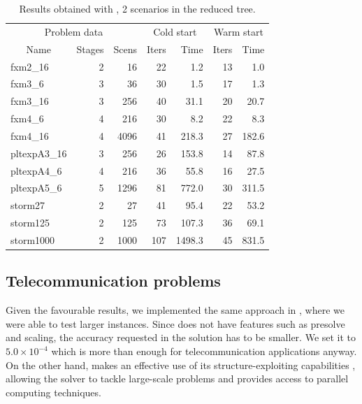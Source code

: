 \begin{table}[ht]
  \begin{center}
    \begin{tabular}{|l|r|r||r|r||r|r|} \hline
      \multicolumn{3}{|c||}{Problem data}&\multicolumn{2}{c||}{Cold start}&\multicolumn{2}{c|}{Warm start}\\
      \multicolumn{1}{|c|}{Name} & Stages & Scens & Iters & Time & Iters & Time \\ \hline \hline
fxm2\_16     &  2 &   16 &  22 &   1.2 & 13 &   1.0 \\
fxm3\_6      &  3 &   36 &  30 &   1.5 & 17 &   1.3 \\
fxm3\_16     &  3 &  256 &  40 &  31.1 & 20 &  20.7 \\
fxm4\_6      &  4 &  216 &  30 &   8.2 & 22 &   8.3 \\
fxm4\_16     &  4 & 4096 &  41 & 218.3 & 27 & 182.6 \\ \hline
pltexpA3\_16 &  3 &  256 &  26 & 153.8 & 14 &  87.8 \\
pltexpA4\_6  &  4 &  216 &  36 &  55.8 & 16 &  27.5 \\
pltexpA5\_6  &  5 & 1296 &  81 & 772.0 & 30 & 311.5 \\ \hline
storm27      &  2 &   27 &  41 &  95.4 & 22 &  53.2 \\
storm125     &  2 &  125 &  73 & 107.3 & 36 &  69.1 \\
storm1000    &  2 & 1000 & 107 &1498.3 & 45 & 831.5 \\ \hline
    \end{tabular}
    \caption{Results obtained with \HOPDM, 2 scenarios in the reduced tree.}
    \label{table:hopdm}
  \end{center} \vspace{-3ex}
\end{table}

%
%
\subsection{Telecommunication problems}

Given the favourable results, we implemented the same approach 
in \OOPS \cite{GondzioSarkissian,GondzioGrothey04}, where we were 
able to test larger instances. 
Since \OOPS does not have features such as presolve and scaling,
the accuracy requested in the solution has to be smaller. We set it to
$5.0 \times 10^{-4}$ which is more than enough for telecommunication
applications anyway.
On the other hand, \OOPS makes an effective use of its structure-exploiting
capabilities \cite{GondzioSarkissian,GondzioGrothey04},
allowing the solver to tackle large-scale problems 
and provides access to parallel computing techniques.

